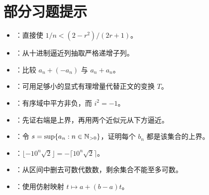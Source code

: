 \section*{部分习题提示}
\begin{itemize}
 \item {}：直接使 \(1/n<(2-r^2)/(2r+1)\)。
 \item {}：从十进制逼近列抽取严格递增子列。
 \item {}：比较 \(a_n+(-a_n)\) 与 \(a_n+a_n\)。
 \item {}：可用足够小的显式有理增量代替正文的变换 \(T\)。
 \item {}：有序域中平方非负，而 \(i^2=-1\)。
 \item {}：先证右端是上界，再用两个近似元从下方逼近。
\item {}：令 \(s=\sup\{a_n:n\in\mathbb{N}_{>0}\}\)，证明每个 \(b_n\) 都是该集合的上界。
 \item {}：\(\lfloor-10^n\sqrt2\rfloor=-\lceil10^n\sqrt2\rceil\)。
 \item {}：从区间中删去可数代数数，剩余集合不能至多可数。
 \item {}：使用仿射映射 \(t\mapsto a+(b-a)t\)。
\end{itemize}
